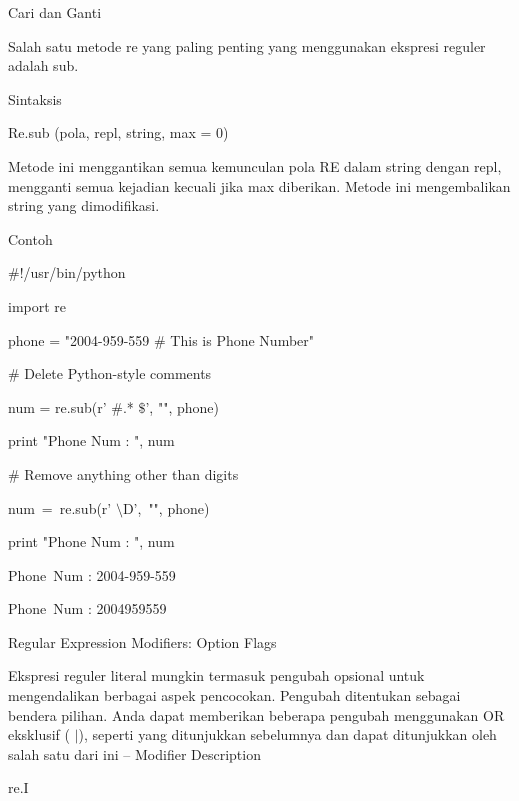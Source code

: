 \begin {enumerate}
\begin {enumerate}
Cari dan Ganti \par
\vspace{12pt}
\noindent
Salah satu metode re yang paling penting yang menggunakan ekspresi reguler adalah sub. \par
\noindent
Sintaksis \par
\vspace{12pt}
Re.sub (pola, repl, string, max = 0) \par
\vspace{12pt}
\noindent
Metode ini menggantikan semua kemunculan pola RE dalam string dengan repl, mengganti semua kejadian kecuali jika max diberikan. Metode ini mengembalikan string yang dimodifikasi. \par
Contoh \par
\noindent
 $  \#  $!/usr/bin/python \par
\noindent
import re \par
\vspace{12pt}
\noindent
phone = "2004-959-559  $  \#  $ This is Phone Number" \par
\vspace{12pt}
\noindent
 $  \#  $ Delete Python-style comments \par
\noindent
num = re.sub(r' $  \#  $.* $  \$  $', "", phone) \par
\noindent
print "Phone Num : ", num \par
\vspace{12pt}
\noindent
 $  \#  $ Remove anything other than digits \par
\noindent
num~=~re.sub(r' $  \setminus  $D',~"", phone)     \par
\noindent
print "Phone Num : ", num \par
\vspace{12pt}
\noindent
Phone~Num :  2004-959-559 \par
\noindent
Phone~Num :  2004959559 \par
\vspace{12pt}
\noindent
Regular Expression Modifiers: Option Flags \par
Ekspresi reguler literal mungkin termasuk pengubah opsional untuk mengendalikan berbagai aspek pencocokan. Pengubah ditentukan sebagai bendera pilihan. Anda dapat memberikan beberapa pengubah menggunakan OR eksklusif ( $  \vert  $), seperti yang ditunjukkan sebelumnya dan dapat ditunjukkan oleh salah satu dari ini – Modifier Description  \par
\noindent
re.I \hspace*{0.5in}  \par

\end{enumerate}
\end{enumerate}
